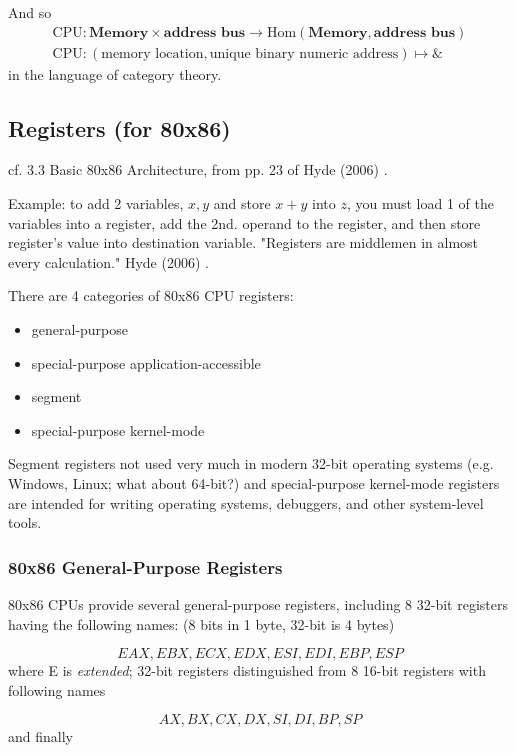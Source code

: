 \documentclass[10pt]{amsart}
\begin{document}
\begin{multicols*}{2}
And so
\[
\begin{gathered}
\text{CPU} : \textbf{Memory} \times \textbf{address bus} \to \text{Hom}{(\textbf{Memory} , \textbf{address bus}) } \\ 
	\text{CPU}: (\text{memory location} , \text{unique binary numeric address}) \mapsto \&
\end{gathered}
\]
in the language of category theory.  

\subsection{Registers (for 80x86)}  

cf. 3.3 Basic 80x86 Architecture, from pp. 23 of Hyde (2006) \cite{Hyde2006}.  

Example: to add 2 variables, $x,y$ and store $x+y$ into $z$, you must load 1 of the variables into a register, add the 2nd. operand to the register, and then store register's value into destination variable.  "Registers are middlemen in almost every calculation." Hyde (2006) \cite{Hyde2006}.  
    

 There are 4 categories of 80x86 CPU registers: 
 \begin{itemize}
 	\item general-purpose
 	\item special-purpose application-accessible
 	\item segment
 	\item special-purpose kernel-mode
 \end{itemize}
Segment registers not used very much in modern 32-bit operating systems (e.g. Windows, Linux; what about 64-bit?) and special-purpose kernel-mode registers are intended for writing operating systems, debuggers, and other system-level tools.  

\subsubsection{80x86 General-Purpose Registers}  

80x86 CPUs provide several general-purpose registers, including 8 32-bit registers having the following names: (8 bits in 1 byte, 32-bit is 4 bytes)

\[
EAX, EBX, ECX, EDX, ESI, EDI, EBP, ESP
\]
where E is \emph{extended}; 32-bit registers distinguished from 8 16-bit registers with following names 

\[
AX, BX, CX, DX, SI, DI, BP, SP
\]
and finally 


\end{multicols*}
\end{document}
